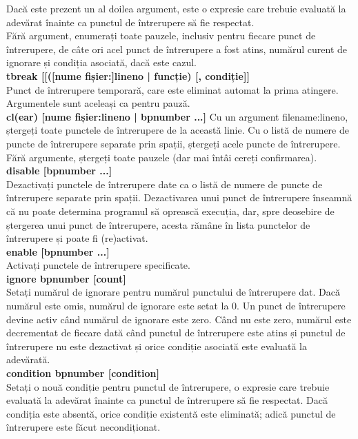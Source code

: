 \documentclass[oneside,20pt]{article}          %
\begin{document}
Dacă este prezent un al doilea argument, este o expresie care trebuie evaluată la adevărat înainte ca punctul de întrerupere să fie respectat.\\

Fără argument, enumerați toate pauzele, inclusiv pentru fiecare punct de întrerupere, de câte ori acel punct de întrerupere a fost atins, numărul curent de ignorare și condiția asociată, dacă este cazul.\\

\textbf{tbreak [[([nume fișier:]lineno | funcție) [, condiție]]}\\
Punct de întrerupere temporară, care este eliminat automat la prima atingere. Argumentele sunt aceleași ca pentru pauză.\\

\textbf{cl(ear) [nume fișier:lineno | bpnumber ...]}
Cu un argument filename:lineno, ștergeți toate punctele de întrerupere de la această linie. Cu o listă de numere de puncte de întrerupere separate prin spații, ștergeți acele puncte de întrerupere. Fără argumente, ștergeți toate pauzele (dar mai întâi cereți confirmarea).\\
\textbf{
disable [bpnumber ...]}\\
Dezactivați punctele de întrerupere date ca o listă de numere de puncte de întrerupere separate prin spații. Dezactivarea unui punct de întrerupere înseamnă că nu poate determina programul să oprească execuția, dar, spre deosebire de ștergerea unui punct de întrerupere, acesta rămâne în lista punctelor de întrerupere și poate fi (re)activat.\\

\textbf{
enable [bpnumber ...]}\\
Activați punctele de întrerupere specificate.\\

\textbf{ignore bpnumber [count]}\\
Setați numărul de ignorare pentru numărul punctului de întrerupere dat. Dacă numărul este omis, numărul de ignorare este setat la 0. Un punct de întrerupere devine activ când numărul de ignorare este zero. Când nu este zero, numărul este decrementat de fiecare dată când punctul de întrerupere este atins și punctul de întrerupere nu este dezactivat și orice condiție asociată este evaluată la adevărată.\\

\textbf{condition bpnumber [condition]}\\
Setați o nouă condiție pentru punctul de întrerupere, o expresie care trebuie evaluată la adevărat înainte ca punctul de întrerupere să fie respectat. Dacă condiția este absentă, orice condiție existentă este eliminată; adică punctul de întrerupere este făcut necondiționat.\\
\end{document}

